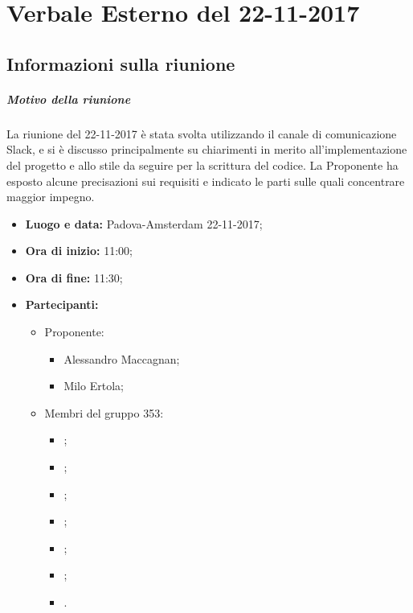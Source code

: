 \documentclass[RaccoltaVerbali.tex]{subfiles}
\begin{document}
\chapter{Verbale Esterno del 22-11-2017}
\section{Informazioni sulla riunione}
\paragraph{Motivo della riunione} La riunione del 22-11-2017 è stata svolta utilizzando il canale di comunicazione Slack, e si è discusso principalmente su chiarimenti in merito all'implementazione del progetto e allo stile da seguire per la scrittura del codice. La Proponente ha esposto alcune precisazioni sui requisiti e indicato le parti sulle quali concentrare maggior impegno.
\begin{itemize}
	\item \textbf{Luogo e data:} Padova-Amsterdam 22-11-2017;
	\item \textbf{Ora di inizio:} 11:00;
	\item \textbf{Ora di fine:} 11:30;
	\item \textbf{Partecipanti:}
	\begin{itemize}
	\item Proponente:
	\begin{itemize}
		\item Alessandro Maccagnan;
		\item Milo Ertola;
	\end{itemize}
	\item Membri del gruppo 353:
	\begin{itemize}
		\item \Davide;
		\item \Elena;
		\item \Gianluca;
		\item \Mirco;
		\item \Parwinder;
		\item \Riccardo;
		\item \Valentina.
	\end{itemize}
	\end{itemize}
\end{itemize}
\end{document}
